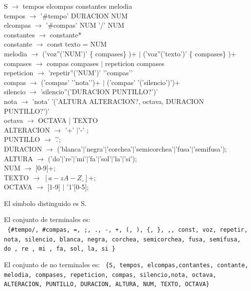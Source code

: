 \documentclass[a4paper]{article}
\begin{document}
S $\rightarrow$ tempos elcompas constantes melodia \\
tempos $\rightarrow$ '\#tempo' DURACION NUM \\
elcompas $\rightarrow$  '\#compas' NUM '/' NUM \\
constantes $\rightarrow$  constante* \\
constante $\rightarrow$  const texto = NUM \\
melodia $\rightarrow$  ('voz''('NUM')' \{ compases\} )+ $|$ ('voz''('texto')' \{ compases\} )+ \\
compases $\rightarrow$ compas compases $|$ repeticion compases \\
repeticion $\rightarrow$ 'repetir''('NUM')' '{'compas'}' \\
compas $\rightarrow$ ('compas' '{'nota'}')+ $|$ ('compas' '('silencio')')+ \\
silencio $\rightarrow$ 'silencio''('DURACION PUNTILLO?')' \\
nota $\rightarrow$ 'nota' '('ALTURA ALTERACION?, octava, DURACION PUNTILLO?')' \\
octava $\rightarrow$ OCTAVA $|$ TEXTO \\
ALTERACION $\rightarrow$ '+' $|$'-' ; \\
PUNTILLO $\rightarrow$ '.'; \\
DURACION $\rightarrow$ ('blanca'$|$'negra'$|$'corchea'$|$'semicorchea'$|$'fusa'$|$'semifusa'); \\
ALTURA $\rightarrow$ ('do'$|$'re'$|$'mi'$|$'fa'$|$'sol'$|$'la'$|$'si'); \\
NUM $\rightarrow$ [0-9]+; \\
TEXTO $\rightarrow$ $[a-zA-Z\_]$+; \\
OCTAVA $\rightarrow$ [1-9] $|$ '1'[0-5]; \linebreak



El símbolo distinguido es S.\linebreak

El conjunto de terminales es: \\
\texttt{
\{\#tempo/, \#compas, =, ;, ., -, +, (, ), \{, \}, ,,  const, voz, repetir, nota, silencio, blanca, negra, corchea, semicorchea, fusa, semifusa, do , re , mi , fa, sol, la, si  \}
}\linebreak


El conjunto de no terminales es:\linebreak
\texttt{
\{S, tempos, elcompas,contantes, contante, melodia, compases, repeticion, compas, silencio,nota, octava, ALTERACION, PUNTILLO, DURACION, ALTURA, NUM, TEXTO, OCTAVA\}  \\
} 
\end{document}
